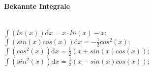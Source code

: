 \documentclass[paper=a3,paper=landscape, fontsize=9pt,DIV=30]{scrartcl}
\begin{document}
\begin{multicols*}{4}
\begin{multicols*}{2}
        \end{multicols*}

        \paragraph{Bekannte Integrale}

        \begin{multicols*}{2}
          \hspace{0pt}\\$\int \left( ln(x)          \right) \mathrm{d}x = x \cdot ln(x)-x;$\\
          $\int \left( sin(x)cos(x)   \right) \mathrm{d}x = -\frac{1}{2}cos^2(x);$\\
          $\int \left( cos^2(x)       \right) \mathrm{d}x = \frac{1}{2}(x+sin(x)cos(x));$
          $\int \left( sin^2(x)       \right) \mathrm{d}x = \frac{1}{2}(x-sin(x)cos(x));$
        \end{multicols*}

\end{multicols*}
\end{document}
